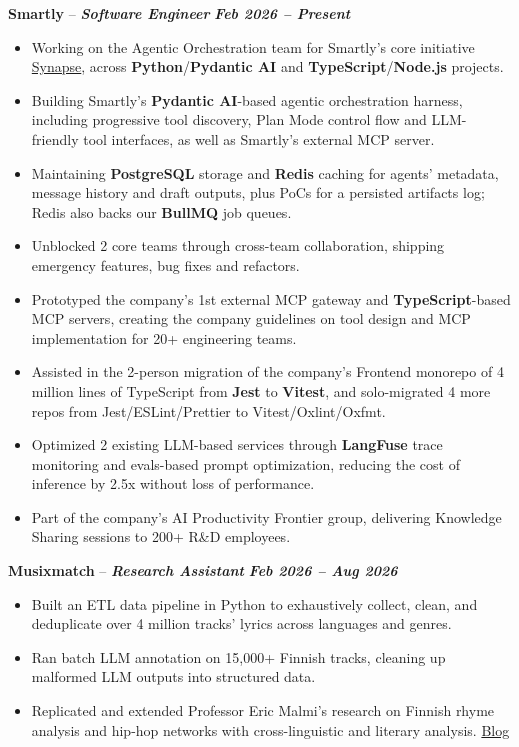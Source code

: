 \documentclass[11pt,a4paper]{article}
\newcommand{\experienceheader}[3]{%
    \Needspace{7\baselineskip}%
    \noindent\textbf{#1} -- \textbf{\textit{#2}} \hfill \textbf{\textit{#3}}%
}
\begin{document}
\experienceheader{Smartly}{Software Engineer}{Feb 2026 -- Present}
\begin{itemize}
    \item Working on the Agentic Orchestration team for Smartly's core initiative \href{https://www.smartly.io/product/synapse}{Synapse}, across \textbf{Python}/\allowbreak\textbf{Pydantic AI} and \textbf{TypeScript}/\allowbreak\textbf{Node.js} projects.
    \item Building Smartly's \textbf{Pydantic AI}-based agentic orchestration harness, including progressive tool discovery, Plan Mode control flow and LLM-friendly tool interfaces, as well as Smartly's external MCP server.
    \item Maintaining \textbf{PostgreSQL} storage and \textbf{Redis} caching for agents' metadata, message history and draft outputs, plus PoCs for a persisted artifacts log; Redis also backs our \textbf{BullMQ} job queues.
    \item Unblocked 2 core teams through cross-team collaboration, shipping emergency features, bug fixes and refactors.
    \item Prototyped the company's 1st external MCP gateway and \textbf{TypeScript}-based MCP servers, creating the company guidelines on tool design and MCP implementation for 20+ engineering teams.
    \item Assisted in the 2-person migration of the company's Frontend monorepo of 4 million lines of TypeScript from \textbf{Jest} to \textbf{Vitest}, and solo-migrated 4 more repos from Jest/ESLint/Prettier to Vitest/Oxlint/Oxfmt.
    \item Optimized 2 existing LLM-based services through \textbf{LangFuse} trace monitoring and evals-based prompt optimization, reducing the cost of inference by 2.5x without loss of performance.
    \item Part of the company's AI Productivity Frontier group, delivering Knowledge Sharing sessions to 200+ R\&D employees.
\end{itemize}

\vspace{8pt}

\experienceheader{Musixmatch}{Research Assistant}{Feb 2026 -- Aug 2026}
\begin{itemize}
    \item Built an ETL data pipeline in Python to exhaustively collect, clean, and deduplicate over 4 million tracks' lyrics across languages and genres.
    \item Ran batch LLM annotation on 15,000+ Finnish tracks, cleaning up malformed LLM outputs into structured data.
    \item Replicated and extended Professor Eric Malmi's research on Finnish rhyme analysis and hip-hop networks with cross-linguistic and literary analysis. \href{https://mining4meaning.com/2026/08/21/raplysaattori-ja-kadonneen-teroittimen-arvoitus/}{Blog}
\end{itemize}
\end{document}
